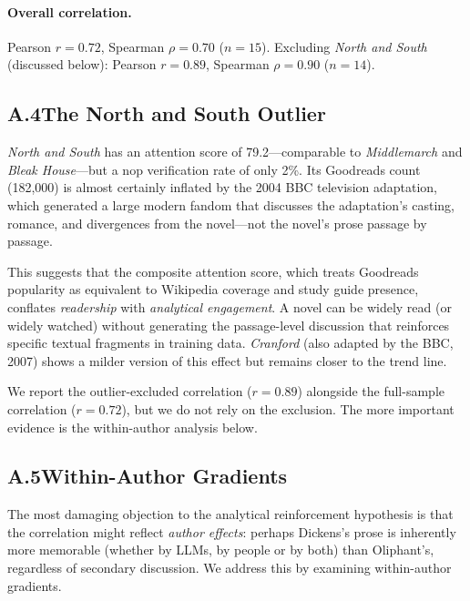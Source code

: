 \paragraph{Overall correlation.}  Pearson $r = 0.72$, Spearman
$\rho = 0.70$ ($n = 15$).  Excluding \emph{North and South}
(discussed below): Pearson $r = 0.89$, Spearman $\rho = 0.90$
($n = 14$).

\subsection*{A.4\quad The North and South Outlier}

\emph{North and South} has an attention score of 79.2---comparable
to \emph{Middlemarch} and \emph{Bleak House}---but a nop verification
rate of only 2\%.  Its Goodreads count (182,000) is almost certainly
inflated by the 2004 BBC television adaptation, which generated a
large modern fandom that discusses the adaptation's casting, romance,
and divergences from the novel---not the novel's prose passage by
passage.

This suggests that the composite attention score, which treats
Goodreads popularity as equivalent to Wikipedia coverage and study
guide presence, conflates \emph{readership} with \emph{analytical
engagement}.  A novel can be widely read (or widely watched) without
generating the passage-level discussion that reinforces specific
textual fragments in training data.  \emph{Cranford} (also adapted by
the BBC, 2007) shows a milder version of this effect but remains
closer to the trend line.

We report the outlier-excluded correlation ($r = 0.89$) alongside the
full-sample correlation ($r = 0.72$), but we do not rely on the
exclusion.  The more important evidence is the within-author analysis
below.

\subsection*{A.5\quad Within-Author Gradients}

The most damaging objection to the analytical reinforcement hypothesis
is that the correlation might reflect \emph{author effects}: perhaps
Dickens's prose is inherently more memorable (whether by LLMs, by people or by both) than Oliphant's,
regardless of secondary discussion.
We address this by examining
within-author gradients.

